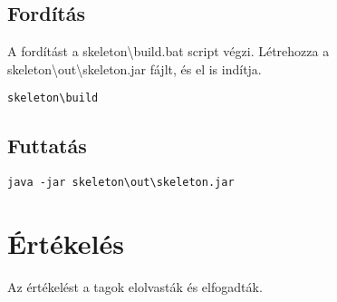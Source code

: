 \subsection{Fordítás}
A fordítást a skeleton\textbackslash{}build.bat script végzi. Létrehozza a skeleton\textbackslash{}out\textbackslash{}skeleton.jar fájlt, és el is indítja.

\lstset{escapeinside=`', xleftmargin=10pt, frame=single, basicstyle=\ttfamily\footnotesize, language=sh}
\begin{lstlisting}
skeleton\build
\end{lstlisting}

\subsection{Futtatás}

\lstset{escapeinside=`', xleftmargin=10pt, frame=single, basicstyle=\ttfamily\footnotesize, language=sh}
\begin{lstlisting}
java -jar skeleton\out\skeleton.jar
\end{lstlisting}

\section{Értékelés}

Az értékelést a tagok elolvasták és elfogadták.

\begin{ertekeles}
\end{ertekeles}

